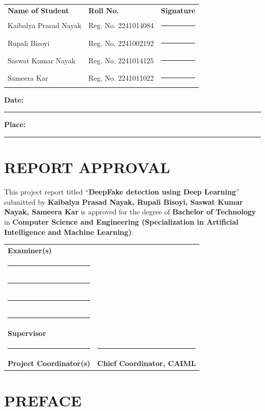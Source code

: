 \documentclass[12pt,a4paper]{report}
\begin{document}
\begin{center}
\begin{tabular}{p{5.2cm}p{5.8cm}p{3.2cm}}
\textbf{Name of Student} & \textbf{Roll No.} & \textbf{Signature} \\[1em]
Kaibalya Prasad Nayak & Reg. No. 2241014084& \rule{3.2cm}{0.2pt} \\[1em]
Rupali Bisoyi & Reg. No. 2241002192& \rule{3.2cm}{0.2pt} \\[1em]
Saswat Kumar Nayak & Reg. No. 2241014125& \rule{3.2cm}{0.2pt} \\[1em]
Sameera Kar & Reg. No. 2241011022& \rule{3.2cm}{0.2pt} \\[1em]
\end{tabular}
\end{center}
\vspace{1cm}
\noindent\textbf{Date:} \rule{5cm}{0.2pt} \hfill \textbf{Place:} \rule{5cm}{0.2pt}



\chapter*{REPORT APPROVAL}

This project report titled “\textbf{DeepFake detection using Deep Learning}” submitted by  \textbf{Kaibalya Prasad Nayak, Rupali Bisoyi, Saswat Kumar Nayak, Sameera Kar} is approved for the degree of \textbf{Bachelor of Technology} in \textbf{Computer Science and Engineering (Specialization in Artificial Intelligence and Machine Learning)}.

\vspace{2cm}
\noindent\begin{tabular}{p{9cm} p{7cm}}
\textbf{Examiner(s)} &\\[0.75cm]
\rule{6.2cm}{1pt} & \\[0.75cm]
\rule{6.2cm}{1pt} & \\[0.75cm]
\rule{6.2cm}{1pt} & \\[3cm]
\rule{6.2cm}{1pt} & \\
\textbf{Supervisor} &\\[3cm]
\rule{6.2cm}{1pt} & \rule{6.5cm}{1pt}\\
\textbf{Project Coordinator(s)} &\textbf{Chief Coordinator, CAIML}\\
\end{tabular}

\newpage
\chapter*{PREFACE}
\end{document}
